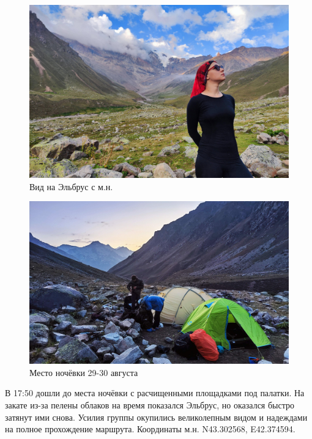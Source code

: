 \begin{figure}[h!]
	\centering
	\includegraphics[width=0.7\linewidth]{../pics/IMG_20240829_181353.jpg}
	\caption{Вид на Эльбрус с м.н.}
	\label{fig:IMG_20240829_184033}
\end{figure}


\begin{figure}[h!]
	\centering
	\includegraphics[width=0.7\linewidth]{../pics/IMG_20240829_191225.jpg}
	\caption{Место ночёвки 29-30 августа}
	\label{fig:IMG_20240829_191225.jpg}
\end{figure}

В 17:50 дошли до места ночёвки с расчищенными площадками под палатки. На закате из-за пелены облаков на время показался Эльбрус, но оказался быстро затянут ими снова. Усилия группы окупились великолепным видом и надеждами на полное прохождение маршрута.
Координаты м.н. N43.302568\degree, E42.374594\degree.


\clearpage